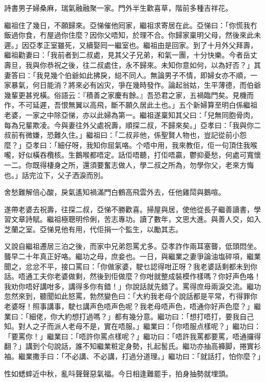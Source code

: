 \documentclass[a5paper, 12pt, openany]{book} %
\begin{document}
	詩書男子婦桑麻，瑞氣融融聚一家。門外半生歡喜草，階前多種吉祥花。

	繼祖住了幾日，不願歸來。亞悌催他囘家，繼祖求寄居在此。亞悌曰：「你慌我冇飯過你食，冇屋過你住麼？因你父唔知，於理不合。你歸家稟明父母，然後來此未遲。」因亞孝正室雖死，又續娶囘一繼室也。繼祖由是回家。到了十月外父拜壽，繼祖勸妻曰：「我前者到二叔處，見其父子兄弟，和氣一團，十分快樂。今者岳丈壽旦，我與你恭祝之後，往二叔處住，永不歸來。未知你意如何，以為好否？」其妻答曰：「我見幾个伯爺如此拂戾，縂不同人。無論男子不情，即婦女亦不順，一家暴氣，何日能消？將來必有凶灾，爭在幾時發作。論起翁姑，生平薄德，而伯爺幾輩更甚兇橫。俗語云：『積善之家慶有餘。』吾恐君之家，五禍臨門矣。見機而作，不可延遲，吾恨無翼以高飛，斷不願久居此土也。」五个新婦算至明白係繼祖老婆，一家之中除亞悌，亦以此婦為第一。繼祖遂稟知其父曰：「兒無同胞骨肉，每為兄輩欺凌。今與妻往外父處祝壽，順探二叔，不歸來矣。」亞孝曰：「我與你二叔前有微嫌，恐難久住。」繼祖曰：「二叔非他，係聖賢人物也，豈記從前小怨麼？」亞孝曰：「細仔呀，我知你屈氣咯。个唔中用，我來教佢，佢一句頂住我喉嚨，好似橫吞欖核。生鵝喉都唔定。話佢唔聽，打佢唔贏，鬱抑憂愁，何處可寬懷一二。你既得棲身之所，還須要奮志做人，學二叔之所為，勿學你父，老來方悔也。」話完泣下，父子洒淚而別。

	舍愁難解倍心酸，戾氣遙知禍滿門白鶴高飛雲外去，任他雞鬦與鵝喧。

	遂帶老婆去祝壽，往探二叔，亞悌不勝歡喜。掃屋與居，使他從長子繼善讀書，學習文章詩賦。繼祖極聰明伶俐，苦志專功。讀了數年，文思大進。與善人交，如入芝蘭之室。亞悌見他有用，代佢捐一个監生，以勵其志。

	又說自繼祖遷居三泊之後，而家中兄弟怨罵尤多。亞孝詐作兩耳塞聾，低頭悶坐。聾早二十年真正好咯。繼功之母，庶妾也。一日，與繼業之妻爭論油塩碎項，繼業聞之，忿忿不平，接口罵曰：「你做家婆，駛乜認得咁正呀？我老婆話剩都未到你話。唔通工夫你老婆做剩，然後到佢做麼？你咁就整成裝模作樣嗎？你好声色咯！我劝你唔好講咁多，講得多你有錯！」你說話就先錯了。罵得庶母兩淚交流。繼功忽然來到，聽聞如此怒罵，勃然變色曰：「大約我老母个說話都是平常，冇得罪你老婆呀！照事講事，駛乜講声色唔声色呢？我老母唔声色，唔通你好声色麼？」繼業曰：「細佬，你大約想打過嗎？」都有幾分意。繼功曰：「想打唔打，要我自己知。對人之子而派人老母不是，實在唔服。」繼業曰：「你唔服点樣呢？」繼功曰：「要罵你！」繼業曰：「唔許你罵点樣呢？」繼功曰：「唔許我罵都要罵，唔通攞得翻？」講到个句說話，誰不知繼業粧定身勢，扎起䯻氏。繼功亦抽高褲脚，捲實衫袖。繼業撒手曰：「不必講、不必講，打過分道理。」繼功曰：「就話打，怕你麼？」

	性如蟋蟀近中秋，亂呌聲聲惡氣福。今日相逢難罷手，拍身抽勢就埋頭。
\end{document}
